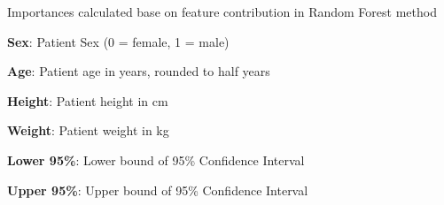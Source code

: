 \documentclass[11pt]{article}
\begin{document}
\begin{codeoutput}
\begin{table}[h]
\caption{Feature importances from the Random Forest model, including confidence intervals}
\label{table:feature_importances}
\begin{threeparttable}
\renewcommand{\TPTminimum}{\linewidth}
\begin{tablenotes}
\footnotesize
\item Importances calculated base on feature contribution in Random Forest method
\item \textbf{Sex}: Patient Sex (0 = female, 1 = male)
\item \textbf{Age}: Patient age in years, rounded to half years
\item \textbf{Height}: Patient height in cm
\item \textbf{Weight}: Patient weight in kg
\item \textbf{Lower 95\%}: Lower bound of 95\% Confidence Interval
\item \textbf{Upper 95\%}: Upper bound of 95\% Confidence Interval
\end{tablenotes}
\end{threeparttable}
\end{table}

\end{codeoutput}
\end{document}
